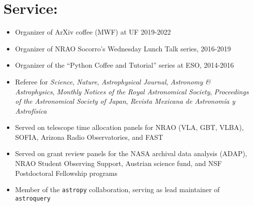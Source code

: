 
\begin{minipage}{\textwidth}
\setlength{\extrarowheight}{4pt}
\section*{Service:}
\vspace{-10pt}
\begin{itemize}
\itemsep-3pt
        
    \item Organizer of ArXiv coffee (MWF) at UF 2019-2022
    \item Organizer of NRAO Socorro's Wednesday Lunch Talk series, 2016-2019
    \item Organizer of the ``Python Coffee and Tutorial'' series at ESO, 2014-2016
    \item Referee for 
            \textit{Science},
            \textit{Nature},
            \textit{Astrophysical Journal},
            \textit{Astronomy \& Astrophysics},
            \textit{Monthly Notices of the Royal Astronomical Society},
            \textit{Proceedings of the Astronomical Society of Japan},
            \textit{Revista Mexicana de Astronom{\'i}a y Astrof{\'i}sica}
    \item Served on telescope time allocation panels for NRAO (VLA, GBT, VLBA), SOFIA,
        Arizona Radio Observatories, and FAST
    \item Served on grant review panels for the NASA archival data analysis (ADAP), 
        NRAO Student Observing Support,
        Austrian science fund,
        and NSF Postdoctoral Fellowship programs
    \item Member of the \texttt{astropy} collaboration, serving as lead maintainer
        of \texttt{astroquery} %
\end{itemize}


\end{minipage}
